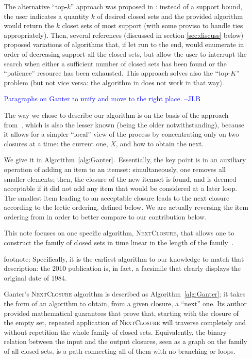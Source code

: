 \documentclass{article}
\newcommand{\added}[1]{\textcolor{blue}{#1}}
\begin{document}
The alternative ``top-$k$'' approach was proposed in 
\cite{han2002mining}: instead of a support bound,
the user indicates a quantity $k$ of desired closed
sets and the provided algorithm would return the $k$
closet sets of most support (with some proviso to 
handle ties appropriately). Then, several references 
(discussed in section \ref{sec:discuss} below)
proposed variations of algorithms that, if let 
run to the end, would enumerate in order of decreasing support 
all the closed sets, but allow the user to interrupt the search 
when either a sufficient number of closed sets has been found 
or the ``patience'' resource has been exhausted. 
This approach solves also the ``top-$K$'' problem
(but not vice versa: the algorithm in \cite{han2002mining}
does not work in that way).

{

\narrower


\added{Paragraphs on Ganter to unify and move to the right place. --JLB}

The way we chose to describe our
algorithm is on the basis of the approach from~\cite{Gant10}, 
which is also the lesser
known (being the older notwithstanding), because it allows for a
simpler ``local'' view of the process by concentrating only on
two closures at a time: the current one, $X$, and how to obtain the next.

We give it in Algorithm~\ref{alg:Ganter}.~Essentially, 
the key point is in an auxiliary operation of adding 
an item to an itemset: 
simultaneously, one removes all smaller elements;
then, the closure of
the new itemset is found, and is deemed acceptable if it did not add
any item that would be considered at a later loop. The smallest item
leading to an acceptable closure leads to the next closure according
to the lectic ordering, defined below. We are actually reversing the 
item ordering from \cite{Gant10} in order to better compare to our 
contribution below.

This note focuses on one specific algorithm,
\textsc{NextClosure}, that allows one to construct
the family of closed sets in time linear in the length
of the family~\cite{Gant10}.

footnote: Specifically, it is
the earliest algorithm to our knowledge to match 
that description: the 2010 publication \cite{Gant10} 
is, in fact, a facsimile that clearly displays the 
original date of 1984.

Ganter's \textsc{NextClosure} algorithm is described as 
Algorithm~\ref{alg:Ganter}; it takes the form of an algorithm 
to obtain, from a given closure, a ``next'' one. Its author 
provided mathematical guarantees that prove that, starting 
with the closure of the empty set, repeated application of 
\textsc{NextClosure} will traverse completely and without 
repetition the whole family of closed sets. Equivalently, 
the binary relation between the input and the output closures, 
seen as a graph on the family of all closed sets, is a path 
connecting all of them with no branching or loops.

}
\end{document}
